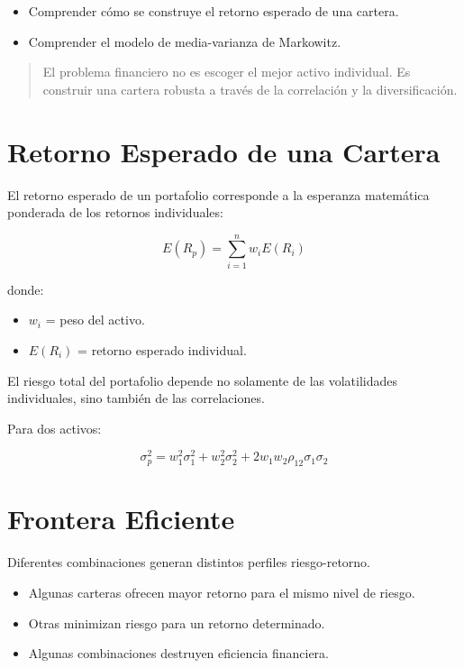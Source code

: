 \begin{itemize}
    \item Comprender cómo se construye el retorno esperado de una cartera.
    \item Comprender el modelo de media-varianza de Markowitz.
\end{itemize}

\begin{quote}
El problema financiero no es escoger el mejor activo individual. Es construir una cartera robusta a través de la correlación y la diversificación.
\end{quote}

\section{Retorno Esperado de una Cartera}

El retorno esperado de un portafolio corresponde a la esperanza matemática ponderada de los retornos individuales:

\[
E(R_p)=\sum_{i=1}^{n} w_i E(R_i)
\]

donde:

\begin{itemize}
    \item $w_i$ = peso del activo.
    \item $E(R_i)$ = retorno esperado individual.
\end{itemize}

El riesgo total del portafolio depende no solamente de las volatilidades individuales, sino también de las correlaciones.

Para dos activos:

\[
\sigma_p^2 = w_1^2\sigma_1^2 + w_2^2\sigma_2^2 + 2w_1w_2\rho_{12}\sigma_1\sigma_2
\]

\section{Frontera Eficiente}

Diferentes combinaciones generan distintos perfiles riesgo-retorno.

\begin{itemize}
    \item Algunas carteras ofrecen mayor retorno para el mismo nivel de riesgo.
    \item Otras minimizan riesgo para un retorno determinado.
    \item Algunas combinaciones destruyen eficiencia financiera.
\end{itemize}


